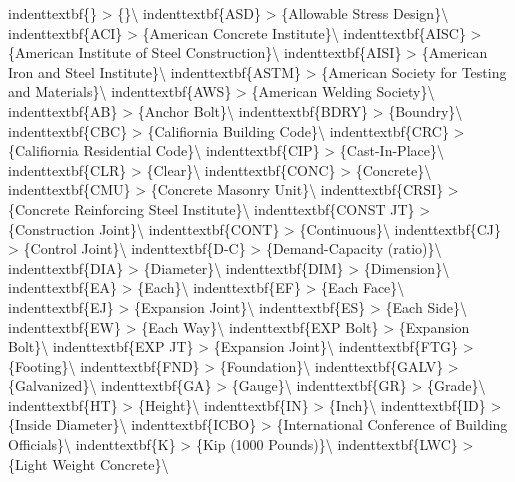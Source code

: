 \documentclass[12pt,notitle,letterpaper]{report}
\renewenvironment{quote}
{\small\list{}{\rightmargin=0cm \leftmargin=0cm}%
    \item\relax}
{\endlist}
\begin{document}
\begin{quote}
\begin{quote}
indenttextbf\{\}         >  \{\}\textbackslash{}
indenttextbf\{ASD\}      >  \{Allowable Stress Design\}\textbackslash{}
indenttextbf\{ACI\}      >  \{American Concrete Institute\}\textbackslash{}
indenttextbf\{AISC\}     >  \{American Institute of Steel Construction\}\textbackslash{}
indenttextbf\{AISI\}     >  \{American Iron and Steel Institute\}\textbackslash{}
indenttextbf\{ASTM\}     >  \{American Society for Testing and Materials\}\textbackslash{}
indenttextbf\{AWS\}      >  \{American Welding Society\}\textbackslash{}
indenttextbf\{AB\}       >  \{Anchor Bolt\}\textbackslash{}
indenttextbf\{BDRY\}     >  \{Boundry\}\textbackslash{}
indenttextbf\{CBC\}      >  \{Califiornia Building Code\}\textbackslash{}
indenttextbf\{CRC\}      >  \{Califiornia Residential Code\}\textbackslash{}
indenttextbf\{CIP\}      >  \{Cast-In-Place\}\textbackslash{}
indenttextbf\{CLR\}      >  \{Clear\}\textbackslash{}
indenttextbf\{CONC\}     >  \{Concrete\}\textbackslash{}
indenttextbf\{CMU\}      >  \{Concrete Masonry Unit\}\textbackslash{}
indenttextbf\{CRSI\}     >  \{Concrete Reinforcing Steel Institute\}\textbackslash{}
indenttextbf\{CONST JT\} >  \{Construction Joint\}\textbackslash{}
indenttextbf\{CONT\}     >  \{Continuous\}\textbackslash{}
indenttextbf\{CJ\}       >  \{Control Joint\}\textbackslash{}
indenttextbf\{D-C\}      >  \{Demand-Capacity (ratio)\}\textbackslash{}
indenttextbf\{DIA\}      >  \{Diameter\}\textbackslash{}
indenttextbf\{DIM\}      >  \{Dimension\}\textbackslash{}
indenttextbf\{EA\}       >  \{Each\}\textbackslash{}
indenttextbf\{EF\}       >  \{Each Face\}\textbackslash{}
indenttextbf\{EJ\}       >  \{Expansion Joint\}\textbackslash{}
indenttextbf\{ES\}       >  \{Each Side\}\textbackslash{}
indenttextbf\{EW\}       >  \{Each Way\}\textbackslash{}
indenttextbf\{EXP Bolt\} >  \{Expansion Bolt\}\textbackslash{}
indenttextbf\{EXP JT\}   >  \{Expansion Joint\}\textbackslash{}
indenttextbf\{FTG\}      >  \{Footing\}\textbackslash{}
indenttextbf\{FND\}      >  \{Foundation\}\textbackslash{}
indenttextbf\{GALV\}     >  \{Galvanized\}\textbackslash{}
indenttextbf\{GA\}       >  \{Gauge\}\textbackslash{}
indenttextbf\{GR\}       >  \{Grade\}\textbackslash{}
indenttextbf\{HT\}       >  \{Height\}\textbackslash{}
indenttextbf\{IN\}       >  \{Inch\}\textbackslash{}
indenttextbf\{ID\}       >  \{Inside Diameter\}\textbackslash{}
indenttextbf\{ICBO\}     >  \{International Conference of Building Officials\}\textbackslash{}
indenttextbf\{K\}        >  \{Kip (1000 Pounds)\}\textbackslash{}
indenttextbf\{LWC\}      >  \{Light Weight Concrete\}\textbackslash{}

\end{quote}
\end{quote}
\end{document}
